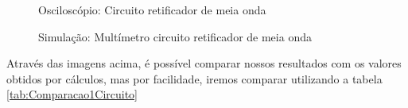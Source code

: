 \begin{figure}[H]
    \centering
    \caption{Osciloscópio: Circuito retificador de meia onda}
    \vspace{-0.3cm}
    \label{fig:OsciloscopioCircuito01}
\end{figure}

\begin{figure}[H]
    \centering
    \caption{Simulação: Multímetro circuito retificador de meia onda}
    \vspace{-0.3cm}
    \label{fig:SimulacaoCircuito01Multimetro}
\end{figure}

Através das imagens acima, é possível comparar nossos resultados com os valores obtidos por cálculos, mas por facilidade, iremos comparar utilizando a tabela \ref{tab:Comparacao1Circuito}


